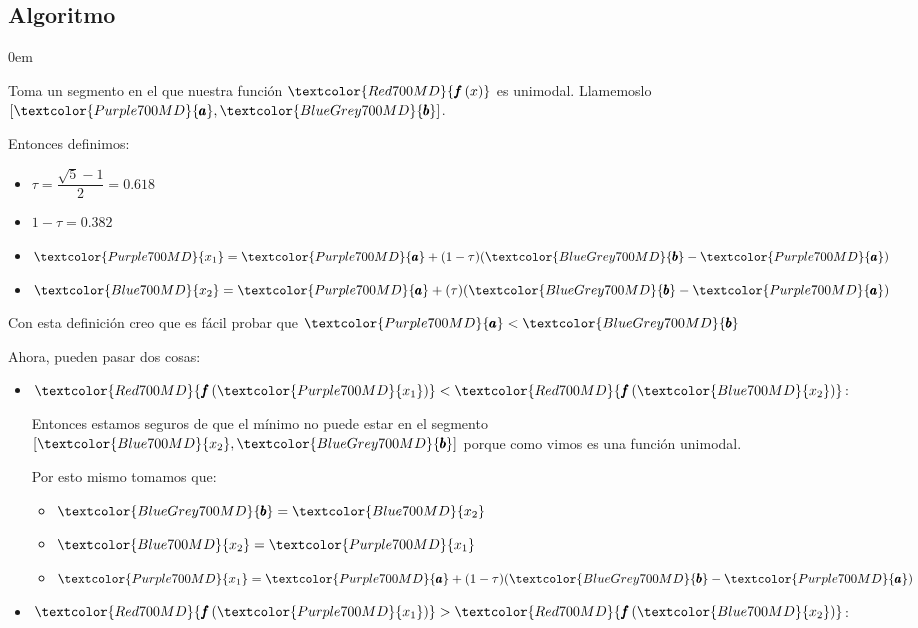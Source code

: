 \documentclass[12pt, fleqn]{article}                            %
\newenvironment{SmallIndentation}[1][0.75em]                    %
        {\begin{adjustwidth}{#1}{}\begin{footnotesize}}             %
        {\end{footnotesize}\end{adjustwidth}}                       %
\newcommand \ForceColumnBreak   {\vfill\null\columnbreak}       %
\theoremstyle{break}                                            %
\newcommand{\Wrap}[1]           {\left( #1 \right)}             %
\newcommand{\Color}[2]{\textcolor{#1}{#2}}                      %
\newcommand \ColorFun          {Red700MD}                       %
\newcommand \ColorVarA         {Purple700MD}                    %
\newcommand \ColorVarB         {BlueGrey700MD}                  %
\newcommand \ColorVarXOne      {Purple700MD}                    %
\newcommand \ColorVarXTwo      {Blue700MD}                      %
\newcommand \Fun[1]      {\Color{\ColorFun}{\pmb{f}\Wrap{#1}}}          %
\newcommand \VarA        {\Color{\ColorVarA}{\pmb{a} }}                 %
\newcommand \VarB        {\Color{\ColorVarB}{\pmb{b} }}                 %
\newcommand \VarXOne     {\Color{\ColorVarXOne}{x_{1}  }}               %
\newcommand \VarXTwo     {\Color{\ColorVarXTwo}{x_{2}  }}               %
\begin{document}
        \subsection{Algoritmo}

            \begin{SmallIndentation}[0em]
                
                Toma un segmento en el que nuestra función $\Fun{x}$ es unimodal. Llamemoslo $[\VarA, \VarB]$.

                Entonces definimos:
                    \begin{itemize}
                        \item $\tau = \dfrac{\sqrt{5}-1}{2} = 0.618$
                        \item $1 - \tau = 0.382$
                        \item $\VarXOne = \VarA + (1-\tau)(\VarB - \VarA)$
                        \item $\VarXTwo = \VarA + (\tau)  (\VarB - \VarA)$
                    \end{itemize}

                Con esta definición creo que es fácil probar que $\VarA < \VarB$

                Ahora, pueden pasar dos cosas:

                \begin{multicols*}{2}
                    \begin{itemize}
                        \item $\Fun{\VarXOne} < \Fun{\VarXTwo}$:

                            Entonces estamos seguros de que el mínimo no puede estar en el segmento 
                            $[\VarXTwo, \VarB]$ porque como vimos es una función unimodal.

                            Por esto mismo tomamos que:
                            \begin{itemize}
                                \item $\VarB = \VarXTwo$
                                \item $\VarXTwo = \VarXOne$
                                \item $\VarXOne = \VarA + (1-\tau)(\VarB - \VarA)$
                            \end{itemize}

                        \ForceColumnBreak

                        \item $\Fun{\VarXOne} > \Fun{\VarXTwo}$:


\end{itemize}
\end{multicols*}
\end{SmallIndentation}
\end{document}
